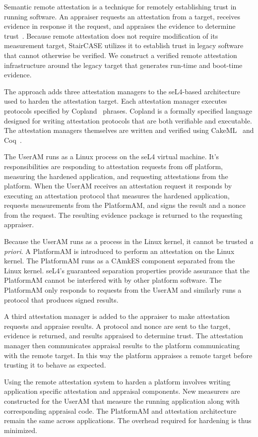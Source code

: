 Semantic remote attestation is a technique for remotely establishing
trust in running software.  An appraiser requests an attestation from
a target, receives evidence in response it the request, and appraises
the evidence to determine
trust~\cite{Haldar:04:Semantic-Remote,Coker::Principles-of-R}. Because
remote attestation does not require modification of its measurement
target, StairCASE utilizes it to establish trust in legacy software
that cannot otherwise be verified.  We construct a verified remote
attestation infrastructure around the legacy target that generates
run-time and boot-time evidence.

The approach adds three attestation managers to the seL4-based
architecture used to harden the attestation target.  Each attestation
manager executes protocols specified by Copland~\cite{Ramsdell:2019aa}
phrases.  Copland is a formally specified language designed for
writing attestation protocols that are both verifiable and executable.
The attestation managers themselves are written and verified using
CakeML~\cite{Kumar:2014:CVI:2535838.2535841} and
Coq~\cite{Bertot:2013aa}.

The UserAM runs as a Linux process on the seL4 virtual machine.  It's
responsibilities are responding to attestation requests from off
platform, measuring the hardened application, and requesting
attestations from the platform.  When the UserAM receives an
attestation request it responds by executing an attestation protocol
that measures the hardened application, requests measurements from the
PlatformAM, and signs the result and a nonce from the request.  The
resulting evidence package is returned to the requesting appraiser.

Because the UserAM runs as a process in the Linux kernel, it cannot be
trusted \emph{a priori}.  A PlatformAM is introduced to perform an
attestation on the Linux kernel.  The PlatformAM runs as a
CAmkES component separated from the Linux kernel.  seL4's guaranteed
separation properties provide assurance that the PlatformAM cannot be
interfered with by other platform software.  The PlatformAM only
responds to requests from the UserAM and similarly runs a protocol
that produces signed results.

A third attestation manager is added to the appraiser to make
attestation requests and appraise results.  A protocol and nonce are
sent to the target, evidence is returned, and results appraised to
determine trust.  The attestation manager then communicates appraisal
results to the platform communicating with the remote target.  In this
way the platform appraises a remote target before trusting it to
behave as expected.

Using the remote attestation system to harden a platform involves
writing application specific attestation and appraisal components.
New measurers are constructed for the UserAM that measure the running
application along with corresponding appraisal code.  The PlatformAM
and attestation architecture remain the same across applications.  The
overhead required for hardening is thus minimized.
